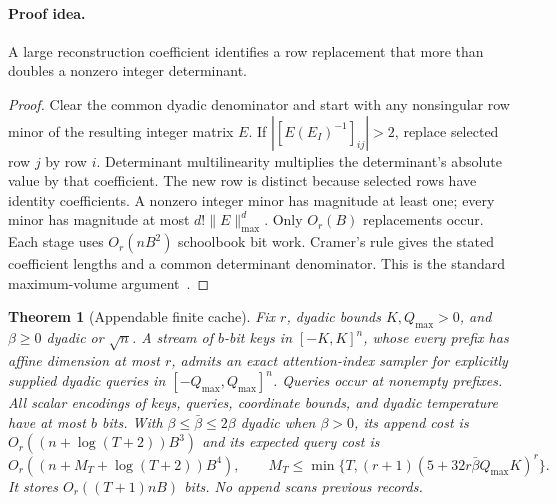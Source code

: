 \documentclass[11pt]{article}
\newtheorem{theorem}{Theorem}[section]
\theoremstyle{definition}\newtheorem{definition}[theorem]{Definition}
\theoremstyle{remark}\newtheorem{remark}[theorem]{Remark}
\numberwithin{equation}{section}
\begin{document}
\paragraph{Proof idea.}
A large reconstruction coefficient identifies a row replacement that
more than doubles a nonzero integer determinant.
\begin{proof}
Clear the common dyadic denominator and start with any nonsingular row
minor of the resulting integer matrix $E$. If $|[E(E_I)^{-1}]_{ij}|>2$,
replace selected row $j$ by row $i$. Determinant multilinearity multiplies
the determinant's absolute value by that coefficient. The new row is
distinct because selected rows have identity coefficients. A nonzero
integer minor has magnitude at least one; every minor has magnitude at
most $d!\|E\|_{\max}^d$. Only $O_r(B)$ replacements occur. Each stage
uses $O_r(nB^2)$ schoolbook bit work. Cramer's rule gives the stated
coefficient lengths and a common determinant denominator. This is the
standard maximum-volume argument~\cite{mikhalev2018maxvol}.
\end{proof}

\begin{theorem}[Appendable finite cache]
\label{thm:conf-grid}
Fix $r$, dyadic bounds $K,Q_{\max}>0$, and $\beta\ge0$ dyadic or
$\sqrt n$. A stream of $b$-bit keys in $[-K,K]^n$, whose every prefix
has affine dimension at most $r$, admits an exact attention-index
sampler for explicitly supplied dyadic queries in $[-Q_{\max},Q_{\max}]^n$.
Queries occur at nonempty prefixes. All scalar encodings of keys, queries,
coordinate bounds, and dyadic temperature have at most $b$ bits. With
$\beta\le\bar\beta\le2\beta$ dyadic when $\beta>0$, its append cost
is $O_r((n+\log(T+2))B^3)$ and its expected query cost is
\[
 O_r((n+M_T+\log(T+2))B^4),\qquad
 M_T\le\min\{T,(r+1)(5+32r\bar\beta Q_{\max}K)^r\}.
\]
It stores $O_r((T+1)nB)$ bits. No append scans previous records.
\end{theorem}
\end{document}
